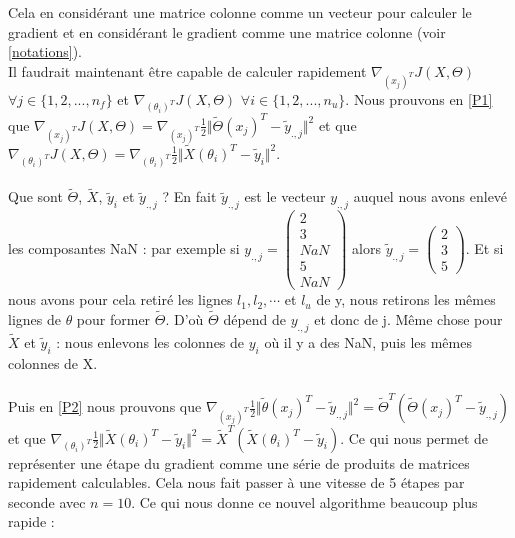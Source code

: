\documentclass[a4paper,10pt]{article}
\begin{document}
\noindent Cela en considérant une matrice colonne comme un vecteur pour calculer le gradient et en considérant le gradient comme une matrice colonne (voir \ref{notations}).\\
Il faudrait maintenant être capable de calculer rapidement $\nabla_{(x_{j})^T}J(X, \Theta)$ $\forall j \in \{1, 2, ..., n_f\}$ et $\nabla_{(\theta_{i})^T} J(X, \Theta)$ $\forall i \in \{1, 2, ..., n_u\}$.
Nous prouvons en \ref{P1} que $ \nabla_{(x_{j})^T}J(X, \Theta) = \nabla_{(x_{j})^T}\frac{1}{2}\Vert\tilde{\Theta}(x_{j})^{T}-\tilde{y}_{.,j}\Vert^{2}$ et que $ \nabla_{(\theta_i)^T}J(X, \Theta) = \nabla_{(\theta_{i})^T}\frac{1}{2}\Vert\tilde{X}(\theta_{i})^{T}-\tilde{y}_{i}\Vert^{2}$.\\\\
Que sont $\tilde{\Theta}$, $\tilde{X}$, $\tilde{y}_i$ et $\tilde{y}_{., j}$ ? En fait $\tilde{y}_{.,j}$ est le vecteur $y_{.,j}$ auquel nous avons enlev\'{e} les composantes NaN : par exemple si $y_{.,j}=
\begin{pmatrix}
2\\3\\NaN\\5\\NaN
\end{pmatrix}$
alors $\tilde{y}_{.,j}=
\begin{pmatrix}
2\\3\\5
\end{pmatrix}$. Et si nous avons pour cela retir\'{e} les lignes $l_{1}, l_{2}, \cdots$ et $l_{u}$ de y, nous retirons les m\^{e}mes lignes de $\theta$ pour former $\tilde{\Theta}$.  D'o\`{u} $\tilde{\Theta}$ d\'{e}pend de $y_{.,j}$ et donc de j. Même chose pour $\tilde{X}$ et $\tilde{y}_i$ : nous enlevons les colonnes de $y_i$ où il y a des NaN, puis les mêmes colonnes de X.\\\\
Puis en \ref{P2} nous prouvons que $ \nabla_{(x_{j})^T}\frac{1}{2}\Vert\tilde{\theta}(x_{j})^{T}-\tilde{y}_{.,j}\Vert^{2} =  \tilde{\Theta}^{T}(\tilde{\Theta}(x_{j})^{T}-\tilde{y}_{.,j})$ et que $\nabla_{(\theta_{i})^T}\frac{1}{2}\Vert\tilde{X}(\theta_{i})^{T}-\tilde{y}_{i}\Vert^{2} =  \tilde{X}^{T}(\tilde{X}(\theta_{i})^{T}-\tilde{y}_{i})$. Ce qui nous permet de représenter une étape du gradient comme une série de produits de matrices rapidement calculables. Cela nous fait passer à une vitesse de 5 étapes par seconde avec $n = 10$.
Ce qui nous donne ce nouvel algorithme beaucoup plus rapide :\\
\end{document}
